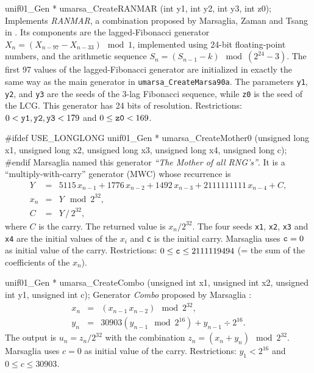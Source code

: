 unif01_Gen * umarsa_CreateRANMAR (int y1, int y2, int y3, int z0);
\endcode
  \tab Implements {\it RANMAR}, a combination proposed by Marsaglia,
 Zaman and Tsang
%
   in \cite{rMAR90b}. Its components are the  lagged-Fibonacci generator
   $X_n = (X_{n - 97} - X_{n - 33}) \mod 1$, implemented using 24-bit 
   floating-point numbers,  and the  arithmetic sequence
   $S_n = (S_{n-1}-k) \mod (2^{24}-3)$.  The first 97 values of the 
   lagged-Fibonacci generator are initialized in  exactly the same way
   as the main generator in {\tt umarsa\_CreateMarsa90a}.
   The parameters
   {\tt y1}, {\tt y2}, and {\tt y3} are the seeds of the
   3-lag Fibonacci sequence, while {\tt z0} is the seed of the LCG.
   This generator has 24 bits of resolution.
   Restrictions: $0 < {\tt y1}, {\tt y2}, {\tt y3} < 179$ and
   $0 \le {\tt z0} < 169$.
  \endtab
\code

#ifdef USE_LONGLONG
   unif01_Gen * umarsa_CreateMother0 (unsigned long x1, unsigned long x2,
      unsigned long x3, unsigned long x4, unsigned long c);
#endif
\endcode
  \tab Marsaglia \cite{rMAR96a} named this generator
   {\it ``The Mother of all RNG's''}. It is a ``multiply-with-carry''
%
   generator  (MWC) whose  recurrence is
  \begin {eqnarray*}
    Y &=& 5115\, x_{n-1} + 1776\,  x_{n-2} + 1492\,  x_{n-3} +
        2111111111\,  x_{n-4} + C, \\
     x_n &=& Y \mod 2^{32}, \\
      C &=& Y \, /\,  2^{32},
  \end {eqnarray*}
   where $C$ is the carry.
   The returned value is $x_n / 2^{32}$.
   The four seeds {\tt x1}, {\tt x2}, {\tt x3} and {\tt x4} are the initial 
   values of the $x_i$ and {\tt c} is the initial carry.
   Marsaglia uses ${\tt c} = 0$ as initial value of the carry.
   Restrictions: $ 0 \le {\tt c} \le 2111119494$
   (= the sum of the coefficients of the $x_{n}$).
  \endtab
\code


unif01_Gen * umarsa_CreateCombo (unsigned int x1, unsigned int x2,
                                 unsigned int y1, unsigned int c);
\endcode
  \tab Generator {\em Combo\/} proposed by Marsaglia \cite{rMAR96a}:
%
  \begin {eqnarray*}
   x_n &=& (x_{n-1} \, x_{n-2}) \mod 2^{32}, \\
    y_n &=& 30903 \left(y_{n-1} \mod 2^{16}\right) + y_{n-1}\div 2^{16}.
  \end {eqnarray*}
   The output is  $u_n = z_n/2^{32}$ with the
   combination $z_n = (x_n + y_n) \mod 2^{32}$.
  Marsaglia uses $c = 0$ as initial value of the carry.
  Restrictions: $y_1 < 2^{16}$ and $0 \le c \le 30903$.
  \endtab
\code


